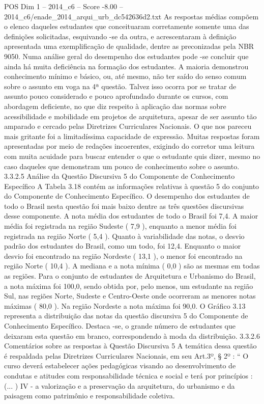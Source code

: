 \begin{textsample}{POS Dim 1 – 2014\_c6 – Score -8.00 – 2014\_c6/enade\_2014\_arqui\_urb\_dc542636d2.txt}
As respostas médias compõem o elenco daqueles estudantes que conceituaram corretamente somente uma das definições solicitadas, esquivando -se da outra, e acrescentaram à definição apresentada uma exemplificação de qualidade, dentre as preconizadas pela NBR 9050.
Numa análise geral do desempenho dos estudantes pode -se concluir que ainda há muita deficiência na formação dos estudantes.
A maioria demonstrou conhecimento mínimo e básico, ou, até mesmo, não ter saído do senso comum sobre o assunto em voga na 4ª questão.
Talvez isso ocorra por se tratar de assunto pouco considerado e pouco aprofundado durante os cursos, com abordagem deficiente, no que diz respeito à aplicação das normas sobre acessibilidade e mobilidade em projetos de arquitetura, apesar de ser assunto tão amparado e cercado pelas Diretrizes Curriculares Nacionais.
O que nos pareceu mais gritante foi a limitadíssima capacidade de expressão.
Muitas respostas foram apresentadas por meio de redações incoerentes, exigindo do corretor uma leitura com muita acuidade para buscar entender o que o estudante quis dizer, mesmo no caso daqueles que demonstram um pouco de conhecimento sobre o assunto. 3.3.2.5 Análise da Questão Discursiva 5 do Componente de Conhecimento Específico A Tabela 3.18 contém as informações relativas à questão 5 do conjunto do Componente de Conhecimento Específico.
O desempenho dos estudantes de todo o Brasil nesta questão foi mais baixo dentre as três questões discursivas desse componente.
A nota média dos estudantes de todo o Brasil foi 7,4.
A maior média foi registrada na região Sudeste ( 7,9 ), enquanto a menor média foi registrada na região Norte ( 5,4 ).
Quanto à variabilidade das notas, o desvio padrão dos estudantes do Brasil, como um todo, foi 12,4.
Enquanto o maior desvio foi encontrado na região Nordeste ( 13,1 ), o menor foi encontrado na região Norte ( 10,4 ).
A mediana e a nota mínima ( 0,0 ) são as mesmas em todas as regiões.
Para o conjunto de estudantes de Arquitetura e Urbanismo do Brasil, a nota máxima foi 100,0, sendo obtida por, pelo menos, um estudante na região Sul, nas regiões Norte, Sudeste e Centro-Oeste onde ocorreram as menores notas máximas ( 80,0 ).
Na região Nordeste a nota máxima foi 90,0.
O Gráfico 3.13 representa a distribuição das notas da questão discursiva 5 do Componente de Conhecimento Específico.
Destaca -se, o grande número de estudantes que deixaram esta questão em branco, correspondendo à moda da distribuição. 3.3.2.6 Comentários sobre as respostas à Questão Discursiva 5 A temática dessa questão é respaldada pelas Diretrizes Curriculares Nacionais, em seu Art.3º, § 2º : “ O curso deverá estabelecer ações pedagógicas visando ao desenvolvimento de condutas e atitudes com responsabilidade técnica e social e terá por princípios : (... ) IV - a valorização e a preservação da arquitetura, do urbanismo e da paisagem como patrimônio e responsabilidade coletiva.

\end{textsample}
